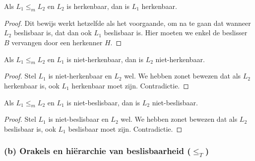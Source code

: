 \begin{theorem}
	Als $L_1 \leq_m L_2$ en $L_2$ is herkenbaar, dan is $L_1$ herkenbaar.
\end{theorem}

\begin{proof}
	Dit bewijs werkt hetzelfde als het voorgaande, om na te gaan dat wanneer $L_2$ beslisbaar is, dat dan ook $L_1$ beslisbaar is. Hier moeten we enkel de beslisser $B$ vervangen door een herkenner $H$.
\end{proof}

\begin{theorem}
	Als $L_1 \leq_m L_2$ en $L_1$ is niet-herkenbaar, dan is $L_2$ niet-herkenbaar.
\end{theorem}

\begin{proof}
	Stel $L_1$ is niet-herkenbaar en $L_2$ wel. We hebben zonet bewezen dat als $L_2$ herkenbaar is, ook $L_1$ herkenbaar moet zijn. Contradictie.
\end{proof}

\begin{theorem}
	Als $L_1 \leq_m L_2$ en $L_1$ is niet-beslisbaar, dan is $L_2$ niet-beslisbaar.
\end{theorem}

\begin{proof}
	Stel $L_1$ is niet-beslisbaar en $L_2$ wel. We hebben zonet bewezen dat als $L_2$ beslisbaar is, ook $L_1$ beslisbaar moet zijn. Contradictie.
\end{proof}

\subsubsection*{(b) Orakels en hi\"erarchie van beslisbaarheid ($\leq_T$)}

